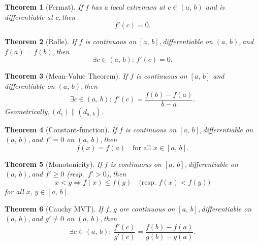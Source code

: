 \documentclass[11pt,reqno]{amsart}
\newcommand{\comma}{,\,\allowbreak}
\theoremstyle{redplain}
\newtheorem{theorem}{Theorem}
\begin{document}
\begin{theorem}[Fermat]
	\label{thm:fermat}
	If $f$ has a local extremum at $c\in(a\comma b)$ and is differentiable at $c$\comma then
	\begin{equation}\label{eq:fermat}
	f'(c)=0.
	\end{equation}
\end{theorem}

\begin{theorem}[Rolle]
	\label{thm:rolle}
	If $f$ is continuous on $[a\comma b]$\comma differentiable on $(a\comma b)$\comma and $f(a)=f(b)$\comma then \begin{equation}\exists c\in(a\comma b):\,f'(c)=0.\end{equation}
\end{theorem}

\begin{theorem}[Mean-Value Theorem]
	\label{thm:mvt}
	If $f$ is continuous on $[a\comma b]$ and differentiable on $(a\comma b)$\comma then
	\begin{equation}\label{eq:mvt}
	\exists c\in(a\comma b):\ f'(c)=\frac{f(b)-f(a)}{b-a}.
	\end{equation}
	Geometrically\comma $(d_c)\parallel (d_{a\comma b})$.
\end{theorem}

\begin{theorem}[Constant-function]
	\label{thm:const}
	If $f$ is continuous on $[a\comma b]$\comma differentiable on $(a\comma b)$\comma and $f'=0$ on $(a\comma b)$\comma then
	\begin{equation}\label{eq:const}
	f(x)=f(a)\quad\text{for all }x\in[a\comma b].
	\end{equation}
\end{theorem}

\begin{theorem}[Monotonicity]
	\label{thm:monotone}
	If $f$ is continuous on $[a\comma b]$\comma differentiable on $(a\comma b)$\comma and $f'\ge0$ (resp.\ $f'>0$)\comma then
	\begin{equation}\label{eq:monotone}
	x<y\Rightarrow f(x)\le f(y)\quad\text{(resp.\ }f(x)<f(y)\text{)}
	\end{equation}
	for all $x\comma y\in[a\comma b]$.
\end{theorem}

\begin{theorem}[Cauchy MVT]
	\label{thm:cauchy-mvt}
	If $f\comma g$ are continuous on $[a\comma b]$\comma differentiable on $(a\comma b)$\comma and $g'\ne0$ on $(a\comma b)$\comma then
	\begin{equation}\label{eq:cauchy-mvt}
	\exists c\in(a\comma b):\ \frac{f'(c)}{g'(c)}=\frac{f(b)-f(a)}{g(b)-g(a)}.
	\end{equation}
\end{theorem}
\end{document}

